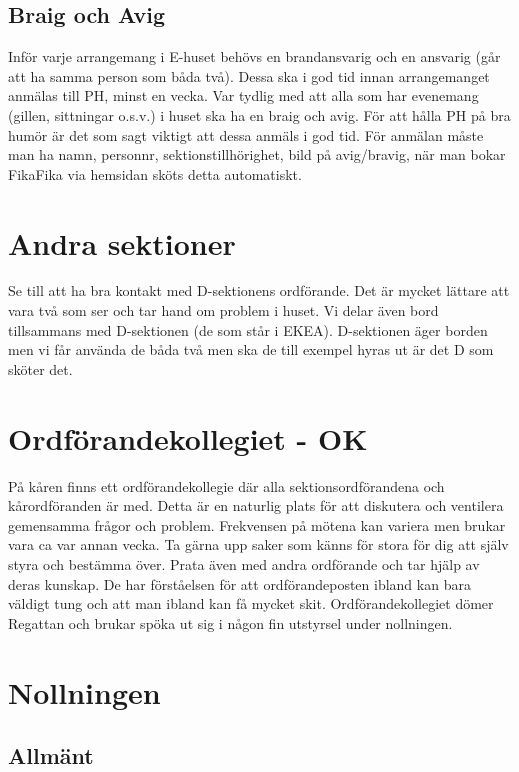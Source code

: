 \documentclass[10pt]{article}
\begin{document}
\subsection{Braig och Avig}

Inför varje arrangemang i E-huset behövs en brandansvarig och en ansvarig (går att ha samma person som båda två). Dessa ska i god tid innan arrangemanget anmälas till PH, minst en vecka. Var tydlig med att alla som har evenemang (gillen, sittningar o.s.v.) i huset ska ha en braig och avig. För att hålla PH på bra humör är det som sagt viktigt att dessa anmäls i god tid. För anmälan måste man ha namn, personnr, sektionstillhörighet, bild på avig/bravig, när man bokar FikaFika via hemsidan sköts detta automatiskt.

\section{Andra sektioner}

Se till att ha bra kontakt med D-sektionens ordförande. Det är mycket lättare att vara två som ser och tar hand om problem i huset. Vi delar även bord tillsammans med D-sektionen (de som står i EKEA). D-sektionen äger borden men vi får använda de båda två men ska de till exempel hyras ut är det D som sköter det.

\section{Ordförandekollegiet - OK}

På kåren finns ett ordförandekollegie där alla sektionsordförandena och kårordföranden är med. Detta är en naturlig plats för att diskutera och ventilera gemensamma frågor och problem. Frekvensen på mötena kan variera men brukar vara ca var annan vecka. Ta gärna upp saker som känns för stora för dig att själv styra och bestämma över. Prata även med andra ordförande och tar hjälp av deras kunskap. De har förståelsen för att ordförandeposten ibland kan bara väldigt tung och att man ibland kan få mycket skit.
Ordförandekollegiet dömer Regattan och brukar spöka ut sig i någon fin utstyrsel under nollningen.

\section{Nollningen}

\subsection{Allmänt}
\end{document}
